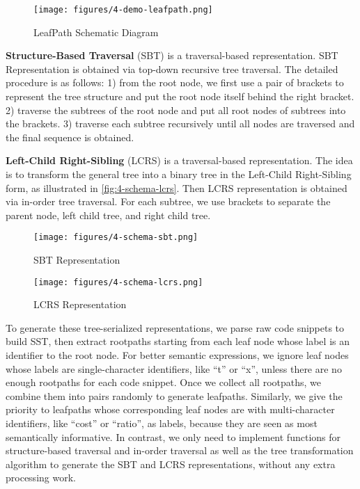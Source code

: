 \documentclass[conference]{IEEEtran}
\begin{document}
\begin{figure}[!htb]
  \centering
  \texttt{[image: figures/4-demo-leafpath.png]}
  \caption{LeafPath Schematic Diagram}
  \label{fig:4-demo-leafpath}
\end{figure}

\textbf{Structure-Based Traversal} (SBT) \cite{Hu2018DeepCC} is a traversal-based representation. SBT Representation is obtained via top-down recursive tree traversal. The detailed procedure is as follows: 1) from the root node, we first use a pair of brackets to represent the tree structure and put the root node itself behind the right bracket. 2) traverse the subtrees of the root node and put all root nodes of subtrees into the brackets. 3) traverse each subtree recursively until all nodes are traversed and the final sequence is obtained.

\textbf{Left-Child Right-Sibling} (LCRS) \cite{Chen2018TreetotreeNN} is a traversal-based representation. The idea is to transform the general tree into a binary tree in the Left-Child Right-Sibling form, as illustrated in \autoref{fig:4-schema-lcrs}. Then LCRS representation is obtained via in-order tree traversal. For each subtree, we use brackets to separate the parent node, left child tree, and right child tree.

\begin{figure}[!htb]
  \centering
  \texttt{[image: figures/4-schema-sbt.png]}
  \caption{SBT Representation}
  \label{fig:4-schema-sbt}
\end{figure}

\begin{figure}[!htb]
  \centering
  \texttt{[image: figures/4-schema-lcrs.png]}
  \caption{LCRS Representation}
  \label{fig:4-schema-lcrs}
\end{figure}

To generate these tree-serialized representations, we parse raw code snippets to build SST, then extract rootpaths starting from each leaf node whose label is an identifier to the root node. For better semantic expressions, we ignore leaf nodes whose labels are single-character identifiers, like ``t'' or ``x'', unless there are no enough rootpaths for each code snippet. Once we collect all rootpaths, we combine them into pairs randomly to generate leafpaths. Similarly, we give the priority to leafpaths whose corresponding leaf nodes are with multi-character identifiers, like ``cost'' or ``ratio'', as labels, because they are seen as most semantically informative. In contrast, we only need to implement functions for structure-based traversal and in-order traversal as well as the tree transformation algorithm to generate the SBT and LCRS representations, without any extra processing work.
\end{document}
